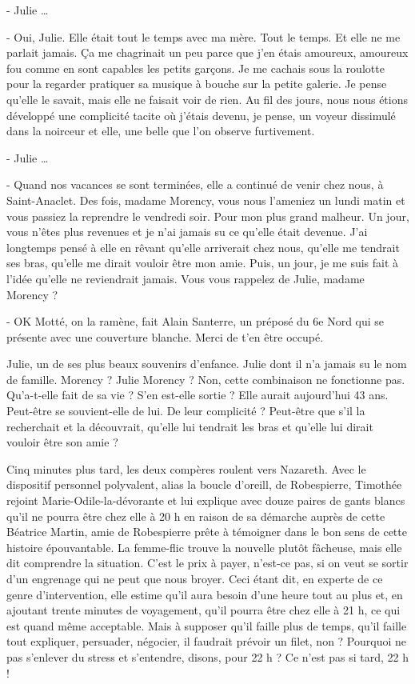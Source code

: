 - Julie …

- Oui, Julie. Elle était tout le temps avec ma mère. Tout le temps. Et elle ne me parlait jamais. Ça me chagrinait un peu parce que j’en étais amoureux, amoureux fou comme en sont capables les petits garçons. Je me cachais sous la roulotte pour la regarder pratiquer sa musique à bouche sur la petite galerie. Je pense qu’elle le savait, mais elle ne faisait voir de rien. Au fil des jours, nous nous étions développé une complicité tacite où j’étais devenu, je pense, un voyeur dissimulé dans la noirceur et elle, une belle que l’on observe furtivement.

- Julie …

- Quand nos vacances se sont terminées, elle a continué de venir chez nous, à Saint-Anaclet. Des fois, madame Morency, vous nous l’ameniez un lundi matin et vous passiez la reprendre le vendredi soir. Pour mon plus grand malheur. Un jour, vous n’êtes plus revenues et je n’ai jamais su ce qu’elle était devenue. J’ai longtemps pensé à elle en rêvant qu’elle arriverait chez nous, qu’elle me tendrait ses bras, qu’elle me dirait vouloir être mon amie. Puis, un jour, je me suis fait à l’idée qu’elle ne reviendrait jamais. Vous vous rappelez de Julie, madame Morency ?

- OK Motté, on la ramène, fait Alain Santerre, un préposé du 6e Nord qui se présente avec une couverture blanche. Merci de t’en être occupé.

Julie, un de ses plus beaux souvenirs d’enfance. Julie dont il n’a jamais su le nom de famille. Morency ? Julie Morency ? Non, cette combinaison ne fonctionne pas. Qu’a-t-elle fait de sa vie ? S’en est-elle sortie ? Elle aurait aujourd’hui 43 ans. Peut-être se souvient-elle de lui. De leur complicité ? Peut-être que s’il la recherchait et la découvrait, qu’elle lui tendrait les bras et qu’elle lui dirait vouloir être son amie ?

Cinq minutes plus tard, les deux compères roulent vers Nazareth. Avec le dispositif personnel polyvalent, alias la boucle d’oreill, de Robespierre, Timothée rejoint Marie-Odile-la-dévorante et lui explique avec douze paires de gants blancs qu’il ne pourra être chez elle à 20 h en raison de sa démarche auprès de cette Béatrice Martin, amie de Robespierre prête à témoigner dans le bon sens de cette histoire épouvantable. La femme-flic trouve la nouvelle plutôt fâcheuse, mais elle dit comprendre la situation. C’est le prix à payer, n’est-ce pas, si on veut se sortir d’un engrenage qui ne peut que nous broyer. Ceci étant dit, en experte de ce genre d’intervention, elle estime qu’il aura besoin d’une heure tout au plus et, en ajoutant trente minutes de voyagement, qu’il pourra être chez elle à 21 h, ce qui est quand même acceptable. Mais à supposer qu’il faille plus de temps, qu’il faille tout expliquer, persuader, négocier, il faudrait prévoir un filet, non ? Pourquoi ne pas s’enlever du stress et s’entendre, disons, pour 22 h ? Ce n’est pas si tard, 22 h !

